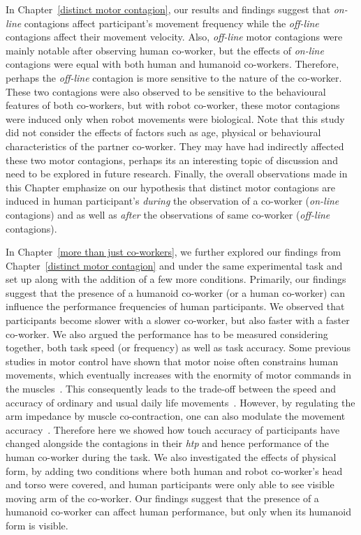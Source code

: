 In Chapter~\ref{distinct motor contagion}, our results and findings suggest that \textit{on-line} contagions affect participant's movement frequency while the \textit{off-line} contagions affect their movement velocity. Also, \textit{off-line} motor contagions were mainly notable after observing human co-worker, but the effects of \textit{on-line} contagions were equal with both human and humanoid co-workers. Therefore, perhaps the \textit{off-line} contagion is more sensitive to the nature of the co-worker. These two contagions were also observed to be sensitive to the behavioural features of both co-workers, but with robot co-worker, these motor contagions were induced only when robot movements were biological. Note that this study did not consider the effects of factors such as age, physical or behavioural characteristics of the partner co-worker. They may have had indirectly affected these two motor contagions, perhaps its an interesting topic of discussion and need to be explored in future research. Finally, the overall observations made in this Chapter emphasize on our hypothesis that distinct motor contagions are induced in human participant's \emph{during} the observation of a co-worker (\textit{on-line} contagions) and as well as \emph{after} the observations of same co-worker (\textit{off-line} contagions).



In Chapter~\ref{more than just co-workers}, we further explored our findings from Chapter~\ref{distinct motor contagion} and under the same experimental task and set up along with the addition of a few more conditions. Primarily, our findings suggest that the presence of a humanoid co-worker (or a human co-worker) can influence the performance frequencies of human participants. We observed that participants become slower with a slower co-worker, but also faster with a faster co-worker. We also argued the performance has to be measured considering together, both task speed (or frequency) as well as task accuracy. Some previous studies in motor control have shown that motor noise often constrains human movements, which eventually increases with the enormity of motor commands in the muscles~\cite{Harris:Nature:1998}. This consequently leads to the trade-off between the speed and accuracy of ordinary and usual daily life movements~\cite{Fitts:JEP:1954}. However, by regulating the arm impedance by muscle co-contraction, one can also modulate the movement accuracy~\cite{Burdet:nature:2001, Franklin:JoN:2008, Ganesh:RAS:2013}. Therefore here we showed how touch accuracy of participants have changed alongside the contagions in their {\it htp} and hence performance of the human co-worker during the task. We also investigated the effects of physical form, by adding two conditions where both human and robot co-worker's head and torso were covered, and human participants were only able to see visible moving arm of the co-worker. Our findings suggest that the presence of a humanoid co-worker can affect human performance, but only when its humanoid form is visible.


